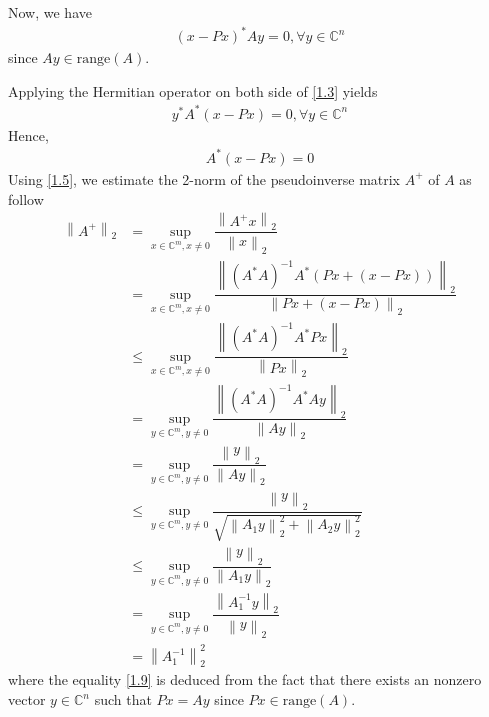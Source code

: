 \documentclass[a4paper,oneside]{book}
\numberwithin{equation}{chapter}
\begin{document}
Now, we have
\begin{align}
\label{1.3}
{\left( {x - Px} \right)^*}Ay = 0,\forall y \in {\mathbb{C}^n}
\end{align}
since $Ay \in \mbox{range}\left(A\right)$. 

Applying the Hermitian operator on both side of \eqref{1.3} yields
\begin{align}
{y^*}{A^*}\left( {x - Px} \right) = 0,\forall y \in {\mathbb{C}^n}
\end{align}
Hence,
\begin{align}
\label{1.5}
{A^*}\left( {x - Px} \right) = 0
\end{align}
Using \eqref{1.5}, we estimate the 2-norm of the pseudoinverse matrix $A^+$ of $A$ as follow
\begin{align}
{\left\| {{A^ + }} \right\|_2} &= {\sup _{x \in {\mathbb{C}^m},x \ne 0}}\dfrac{{{{\left\| {{A^ + }x} \right\|}_2}}}{{{{\left\| x \right\|}_2}}}\\
& = {\sup _{x \in {\mathbb{C}^m},x \ne 0}}\dfrac{{{{\left\| {{{\left( {{A^*}A} \right)}^{ - 1}}{A^*}\left( {Px + \left( {x - Px} \right)} \right)} \right\|}_2}}}{{{{\left\| {Px + \left( {x - Px} \right)} \right\|}_2}}}\\
& \le {\sup _{x \in {\mathbb{C}^m},x \ne 0}}\dfrac{{{{\left\| {{{\left( {{A^*}A} \right)}^{ - 1}}{A^*}Px} \right\|}_2}}}{{{{\left\| {Px} \right\|}_2}}}\\
& = {\sup _{y \in {\mathbb{C}^m},y \ne 0}}\dfrac{{{{\left\| {{{\left( {{A^*}A} \right)}^{ - 1}}{A^*}Ay} \right\|}_2}}}{{{{\left\| {Ay} \right\|}_2}}} \label{1.9}\\
& = {\sup _{y \in {\mathbb{C}^m},y \ne 0}}\dfrac{{{{\left\| y \right\|}_2}}}{{{{\left\| {Ay} \right\|}_2}}}\\
& \le {\sup _{y \in {\mathbb{C}^m},y \ne 0}}\dfrac{{{{\left\| y \right\|}_2}}}{{\sqrt {\left\| {{A_1}y} \right\|_2^2 + \left\| {{A_2}y} \right\|_2^2} }}\\
& \le {\sup _{y \in {\mathbb{C}^m},y \ne 0}}\dfrac{{{{\left\| y \right\|}_2}}}{{{{\left\| {{A_1}y} \right\|}_2}}}\\
& = {\sup _{y \in {\mathbb{C}^m},y \ne 0}}\dfrac{{{{\left\| {A_1^{ - 1}y} \right\|}_2}}}{{{{\left\| y \right\|}_2}}}\\
& = \left\| {A_1^{ - 1}} \right\|_2^2
\end{align}
where the equality \eqref{1.9} is deduced from the fact that there exists an nonzero vector $y \in \mathbb{C}^n$ such that $Px=Ay$ since $Px \in \mbox{range}\left(A\right)$.
\end{document}
